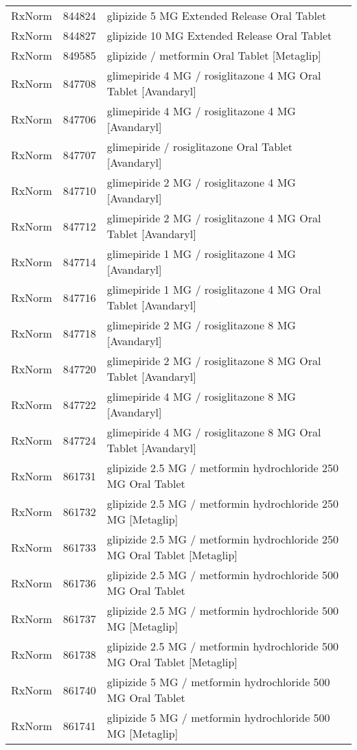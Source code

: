 \begin{longtable}{p{}p{}p{}}
  RxNorm & 844824 & glipizide 5 MG Extended Release Oral Tablet \\ 
  RxNorm & 844827 & glipizide 10 MG Extended Release Oral Tablet \\ 
  RxNorm & 849585 & glipizide / metformin Oral Tablet [Metaglip] \\ 
  RxNorm & 847708 & glimepiride 4 MG / rosiglitazone 4 MG Oral Tablet [Avandaryl] \\ 
  RxNorm & 847706 & glimepiride 4 MG / rosiglitazone 4 MG [Avandaryl] \\ 
  RxNorm & 847707 & glimepiride / rosiglitazone Oral Tablet [Avandaryl] \\ 
  RxNorm & 847710 & glimepiride 2 MG / rosiglitazone 4 MG [Avandaryl] \\ 
  RxNorm & 847712 & glimepiride 2 MG / rosiglitazone 4 MG Oral Tablet [Avandaryl] \\ 
  RxNorm & 847714 & glimepiride 1 MG / rosiglitazone 4 MG [Avandaryl] \\ 
  RxNorm & 847716 & glimepiride 1 MG / rosiglitazone 4 MG Oral Tablet [Avandaryl] \\ 
  RxNorm & 847718 & glimepiride 2 MG / rosiglitazone 8 MG [Avandaryl] \\ 
  RxNorm & 847720 & glimepiride 2 MG / rosiglitazone 8 MG Oral Tablet [Avandaryl] \\ 
  RxNorm & 847722 & glimepiride 4 MG / rosiglitazone 8 MG [Avandaryl] \\ 
  RxNorm & 847724 & glimepiride 4 MG / rosiglitazone 8 MG Oral Tablet [Avandaryl] \\ 
  RxNorm & 861731 & glipizide 2.5 MG / metformin hydrochloride 250 MG Oral Tablet \\ 
  RxNorm & 861732 & glipizide 2.5 MG / metformin hydrochloride 250 MG [Metaglip] \\ 
  RxNorm & 861733 & glipizide 2.5 MG / metformin hydrochloride 250 MG Oral Tablet [Metaglip] \\ 
  RxNorm & 861736 & glipizide 2.5 MG / metformin hydrochloride 500 MG Oral Tablet \\ 
  RxNorm & 861737 & glipizide 2.5 MG / metformin hydrochloride 500 MG [Metaglip] \\ 
  RxNorm & 861738 & glipizide 2.5 MG / metformin hydrochloride 500 MG Oral Tablet [Metaglip] \\ 
  RxNorm & 861740 & glipizide 5 MG / metformin hydrochloride 500 MG Oral Tablet \\ 
  RxNorm & 861741 & glipizide 5 MG / metformin hydrochloride 500 MG [Metaglip] \\ 

\end{longtable}
